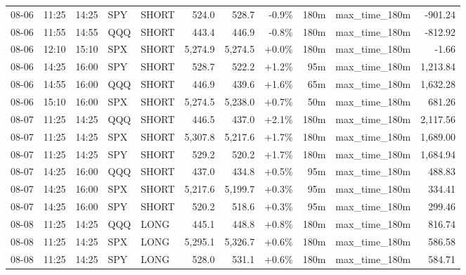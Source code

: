 \documentclass[11pt,a4paper,twoside]{article}
\begin{document}
\begin{center}
\begin{longtable}{>{\color{txtmain}}l l l l l r r r r >{\color{txtmain}}l r}
08-06 & 11:25 & 14:25 & SPY & SHORT & 524.0 & 528.7 & \textcolor{lossred}{-0.9\%} & 180m & max\_time\_180m & \textcolor{lossred}{-901.24} \\
08-06 & 11:55 & 14:55 & QQQ & SHORT & 443.4 & 446.9 & \textcolor{lossred}{-0.8\%} & 180m & max\_time\_180m & \textcolor{lossred}{-812.92} \\
08-06 & 12:10 & 15:10 & SPX & SHORT & 5,274.9 & 5,274.5 & \textcolor{wingreen}{+0.0\%} & 180m & max\_time\_180m & \textcolor{lossred}{-1.66} \\
08-06 & 14:25 & 16:00 & SPY & SHORT & 528.7 & 522.2 & \textcolor{wingreen}{+1.2\%} & 95m & max\_time\_180m & \textcolor{wingreen}{1,213.84} \\
08-06 & 14:55 & 16:00 & QQQ & SHORT & 446.9 & 439.6 & \textcolor{wingreen}{+1.6\%} & 65m & max\_time\_180m & \textcolor{wingreen}{1,632.28} \\
08-06 & 15:10 & 16:00 & SPX & SHORT & 5,274.5 & 5,238.0 & \textcolor{wingreen}{+0.7\%} & 50m & max\_time\_180m & \textcolor{wingreen}{681.26} \\
08-07 & 11:25 & 14:25 & QQQ & SHORT & 446.5 & 437.0 & \textcolor{wingreen}{+2.1\%} & 180m & max\_time\_180m & \textcolor{wingreen}{2,117.56} \\
08-07 & 11:25 & 14:25 & SPX & SHORT & 5,307.8 & 5,217.6 & \textcolor{wingreen}{+1.7\%} & 180m & max\_time\_180m & \textcolor{wingreen}{1,689.00} \\
08-07 & 11:25 & 14:25 & SPY & SHORT & 529.2 & 520.2 & \textcolor{wingreen}{+1.7\%} & 180m & max\_time\_180m & \textcolor{wingreen}{1,684.94} \\
08-07 & 14:25 & 16:00 & QQQ & SHORT & 437.0 & 434.8 & \textcolor{wingreen}{+0.5\%} & 95m & max\_time\_180m & \textcolor{wingreen}{488.83} \\
08-07 & 14:25 & 16:00 & SPX & SHORT & 5,217.6 & 5,199.7 & \textcolor{wingreen}{+0.3\%} & 95m & max\_time\_180m & \textcolor{wingreen}{334.41} \\
08-07 & 14:25 & 16:00 & SPY & SHORT & 520.2 & 518.6 & \textcolor{wingreen}{+0.3\%} & 95m & max\_time\_180m & \textcolor{wingreen}{299.46} \\
08-08 & 11:25 & 14:25 & QQQ & LONG & 445.1 & 448.8 & \textcolor{wingreen}{+0.8\%} & 180m & max\_time\_180m & \textcolor{wingreen}{816.74} \\
08-08 & 11:25 & 14:25 & SPX & LONG & 5,295.1 & 5,326.7 & \textcolor{wingreen}{+0.6\%} & 180m & max\_time\_180m & \textcolor{wingreen}{586.58} \\
08-08 & 11:25 & 14:25 & SPY & LONG & 528.0 & 531.1 & \textcolor{wingreen}{+0.6\%} & 180m & max\_time\_180m & \textcolor{wingreen}{584.71} \\

\end{longtable}
\end{center}
\end{document}
